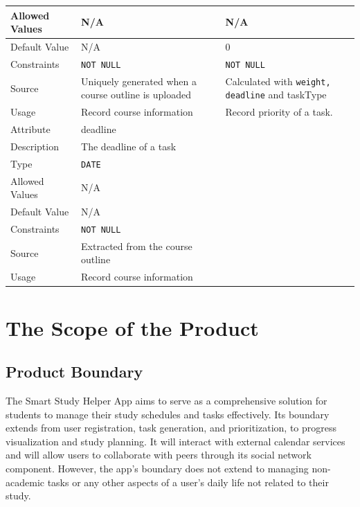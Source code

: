 \documentclass[12pt]{article}
\begin{document}
\begin{longtable}[H]{ |p{3cm}|p{5cm}|p{5cm}|  }
\hline
Allowed Values &N/A &N/A\\
\hline
Default Value &N/A &0\\
\hline
Constraints & \texttt{NOT NULL}&\texttt{NOT NULL}\\
\hline
Source & Uniquely generated when a course outline is uploaded&Calculated with \texttt{weight, deadline} and taskType\\
\hline
Usage & Record course information & Record priority of a task.\\
\hline
Attribute & deadline&\\
\hline
Description & The deadline of a task & \\
\hline
Type & \texttt{DATE}&\\
\hline
Allowed Values &N/A &\\
\hline
Default Value &N/A &\\
\hline
Constraints & \texttt{NOT NULL}&\\
\hline
Source & Extracted from the course outline&\\
\hline
Usage & Record course information & \\
\hline
\end{longtable}


\section{The Scope of the Product}

\subsection{Product Boundary}
The Smart Study Helper App aims to serve as a comprehensive solution for students to manage their study schedules and tasks effectively. Its boundary extends from user registration, task generation, and prioritization, to progress visualization and study planning. It will interact with external calendar services and will allow users to collaborate with peers through its social network component. However, the app’s boundary does not extend to managing non-academic tasks or any other aspects of a user’s daily life not related to their study.
\end{document}
